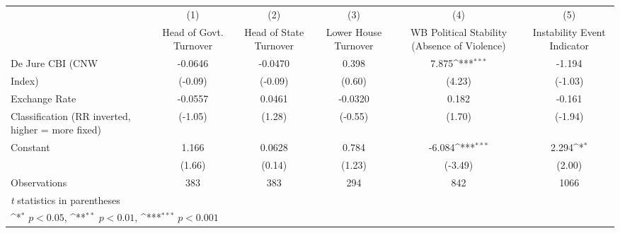 {
\def\sym#1{\ifmmode^{#1}\else\(^{#1}\)\fi}
\begin{tabular}{l*{5}{c}}
\toprule
                &\multicolumn{1}{c}{(1)}&\multicolumn{1}{c}{(2)}&\multicolumn{1}{c}{(3)}&\multicolumn{1}{c}{(4)}&\multicolumn{1}{c}{(5)}\\
                &\multicolumn{1}{c}{Head of Govt. Turnover}&\multicolumn{1}{c}{Head of State Turnover}&\multicolumn{1}{c}{Lower House Turnover}&\multicolumn{1}{c}{WB Political Stability (Absence of Violence)}&\multicolumn{1}{c}{Instability Event Indicator}\\
\midrule
De Jure CBI (CNW&  -0.0646         &  -0.0470         &    0.398         &    7.875\sym{***}&   -1.194         \\
Index)          &  (-0.09)         &  (-0.09)         &   (0.60)         &   (4.23)         &  (-1.03)         \\
\addlinespace
Exchange Rate   &  -0.0557         &   0.0461         &  -0.0320         &    0.182         &   -0.161         \\
Classification (RR inverted, higher = more fixed)&  (-1.05)         &   (1.28)         &  (-0.55)         &   (1.70)         &  (-1.94)         \\
\addlinespace
Constant        &    1.166         &   0.0628         &    0.784         &   -6.084\sym{***}&    2.294\sym{*}  \\
                &   (1.66)         &   (0.14)         &   (1.23)         &  (-3.49)         &   (2.00)         \\
\midrule
Observations    &      383         &      383         &      294         &      842         &     1066         \\
\bottomrule
\multicolumn{6}{l}{\footnotesize \textit{t} statistics in parentheses}\\
\multicolumn{6}{l}{\footnotesize \sym{*} \(p<0.05\), \sym{**} \(p<0.01\), \sym{***} \(p<0.001\)}\\
\end{tabular}
}
